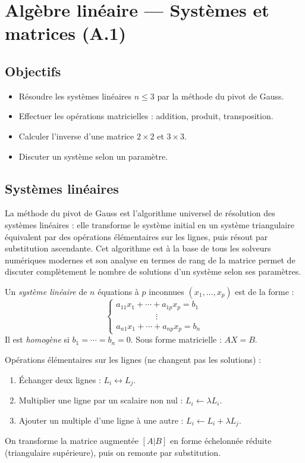 \documentclass[11pt,a4paper,twoside]{book}
\begin{document}
\chapter{Algèbre linéaire — Systèmes et matrices (A.1)}

\section*{Objectifs}
\begin{itemize}[leftmargin=1.5em]
  \item Résoudre les systèmes linéaires $n \leq 3$ par la méthode du pivot de Gauss.
  \item Effectuer les opérations matricielles : addition, produit, transposition.
  \item Calculer l'inverse d'une matrice $2\times2$ et $3\times3$.
  \item Discuter un système selon un paramètre.
\end{itemize}

\section{Systèmes linéaires}

La méthode du pivot de Gauss est l'algorithme universel de résolution des systèmes linéaires : elle transforme le système initial en un système triangulaire équivalent par des opérations élémentaires sur les lignes, puis résout par substitution ascendante. Cet algorithme est à la base de tous les solveurs numériques modernes et son analyse en termes de rang de la matrice permet de discuter complètement le nombre de solutions d'un système selon ses paramètres.

\begin{definitionbox}
Un \emph{système linéaire} de $n$ équations à $p$ inconnues $(x_1,\ldots,x_p)$ est de la forme :
\[
  \begin{cases}
    a_{11}x_1 + \cdots + a_{1p}x_p = b_1 \\
    \hspace{2cm}\vdots \\
    a_{n1}x_1 + \cdots + a_{np}x_p = b_n
  \end{cases}
\]
Il est \emph{homogène} si $b_1=\cdots=b_n=0$. Sous forme matricielle : $AX = B$.
\end{definitionbox}

\begin{methodebox}
Opérations élémentaires sur les lignes (ne changent pas les solutions) :
\begin{enumerate}
  \item Échanger deux lignes : $L_i \leftrightarrow L_j$.
  \item Multiplier une ligne par un scalaire non nul : $L_i \leftarrow \lambda L_i$.
  \item Ajouter un multiple d'une ligne à une autre : $L_i \leftarrow L_i + \lambda L_j$.
\end{enumerate}
On transforme la matrice augmentée $[A|B]$ en forme échelonnée réduite (triangulaire supérieure), puis on remonte par substitution.
\end{methodebox}
\end{document}
